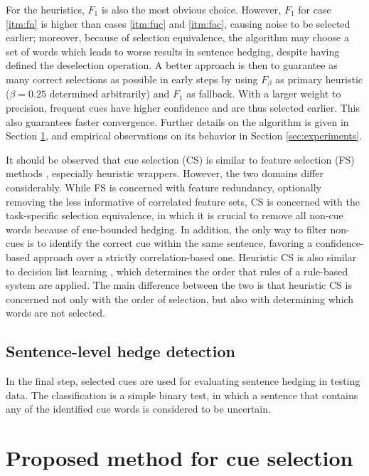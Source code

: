 \documentclass[english]{jnlp_1.4}
\begin{document}
For the heuristics, $F_1$ is also the most obvious choice. However, $F_1$ for case \ref{itm:fn} is higher than cases \ref{itm:fuc} and \ref{itm:fac}, causing noise to be selected earlier; moreover, because of selection equivalence, the algorithm may choose a set of words which leads to worse results in sentence hedging, despite having defined the deselection operation. A better approach is then to guarantee as many correct selections as possible in early steps by using $F_{\beta}$ as primary heuristic ($\beta = 0.25$ determined arbitrarily) and $F_1$ as fallback. With a larger weight to precision, frequent cues have higher confidence and are thus selected earlier. This also guarantees faster convergence. Further details on the algorithm is given in Section \ref{sec:method}, and empirical observations on its behavior in Section \ref{sec:experiments}.

It should be observed that cue selection (CS) is similar to feature selection (FS) methods , especially heuristic wrappers. However, the two domains differ considerably. While FS is concerned with feature redundancy, optionally removing the less informative of correlated feature sets, CS is concerned with the task-specific selection equivalence, in which it is crucial to remove all non-cue words because of cue-bounded hedging. In addition, the only way to filter non-cues is to identify the correct cue within the same sentence, favoring a confidence-based approach over a strictly correlation-based one. Heuristic CS is also similar to decision list learning \cite{chakravarthy08,goodman02}, which determines the order that rules of a rule-based system are applied. The main difference between the two is that heuristic CS is concerned not only with the order of selection, but also with determining which words are not selected.



\subsection{Sentence-level hedge detection}

In the final step, selected cues are used for evaluating sentence hedging in testing data. The classification is a simple binary test, in which a sentence that contains any of the identified cue words is considered to be uncertain.


\section{Proposed method for cue selection}
\label{sec:method}
\end{document}
